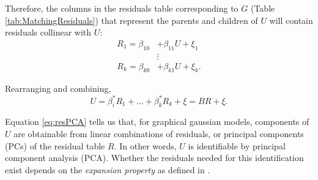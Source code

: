\documentclass{article}
\begin{document}
\begin{center}
\begin{table}[ht]
\centering
{}
\qquad
\qquad
\qquad
\qquad
{}
\caption{The training data frame (Variables) implies a matching data frame (Residuals) once the joint distribution of all variables is specified via a graph and its parameterization}
\label{tab:MatchingResiduals}
\end{table}
\end{center}

Therefore, the columns in the residuals table corresponding to $G$ (Table \ref{tab:MatchingResiduals}) that represent the parents and children of $U$ will contain residuals collinear with $U$:
\begin{equation}
\begin{split}
R_1 = \beta_{10} &+ \beta_{11} U + \xi_1\\
& \vdots\\
R_k = \beta_{k0} &+ \beta_{k1} U + \xi_k.
\end{split}
\end{equation}

Rearranging and combining,
\begin{equation}
U = \beta_i^{*} R_1 + \dots + \beta_k^{*} R_k + \xi = B R + \xi.
\label{eq:resPCA}
\end{equation}

Equation \ref{eq:resPCA} tells us that, for graphical gaussian models, components of $U$ are obtainable from linear combinations of residuals, or principal components (PCs) of the residual table $R$.  In other words, $U$ is identifiable by principal component analysis (PCA).  Whether the residuals needed for this identification exist depends on the \textit{expansion property} as defined in \cite{anandkumar_learning_2013}.
\end{document}
